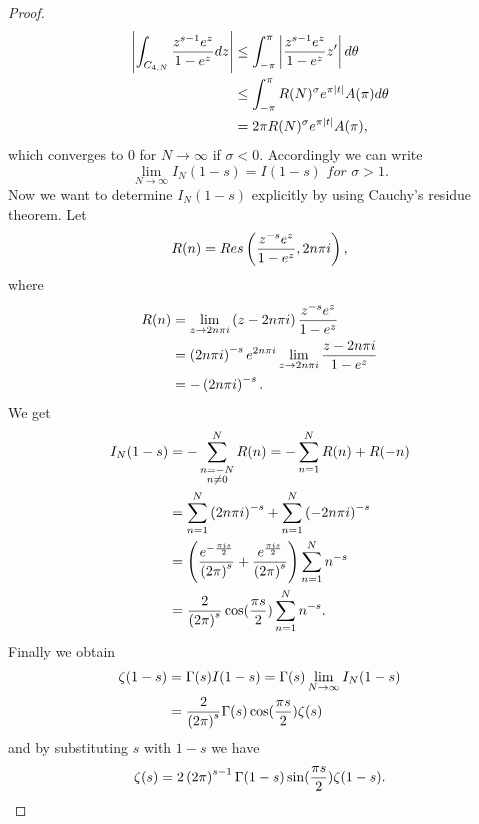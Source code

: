 \begin{proof}
\begin{equation*}
\begin{aligned}
	\left|\int_{C_{4,N}} \frac{z^{s - 1} e^z}{1 - e^z} dz\right|
	&\leq \int_{-\pi}^{\pi} \left|\frac{z^{s - 1} e^z}{1 - e^z} z^\prime\right| d\theta \\
	&\leq \int_{-\pi}^{\pi} R(N)^\sigma e^{\pi \left|t\right|} A(\pi) d\theta \\
	&= 2 \pi R(N)^\sigma e^{\pi \left|t\right|} A(\pi),
\end{aligned}
\end{equation*}
	which converges to $0$ for $N \to \infty$ if $\sigma < 0$. Accordingly we can write
\begin{equation*}
	\lim\limits_{N \to \infty} I_N(1 - s) = I(1 - s) \textit{ for } \sigma > 1.
\end{equation*}
	Now we want to determine $I_N(1 - s)$ explicitly by using Cauchy's residue theorem. Let
\begin{equation*}
	R(n) = Res\left(\frac{z^{-s} e^z}{1 - e^z}, 2 n \pi i\right),
\end{equation*}
	where
\begin{equation*}
\begin{aligned}
	R(n) &= \lim\limits_{z \to 2 n \pi i} \left(z - 2 n \pi i\right) \frac{z^{-s} e^z}{1 - e^z} \\
	&= \left(2 n \pi i\right)^{-s} e^{2 n \pi i} \lim\limits_{z \to 2 n \pi i} \frac{z - 2 n \pi i}{1 - e^z} \\
	&= - \left(2 n \pi i\right)^{-s}.
\end{aligned} 
\end{equation*}
	We get
\begin{equation*}
\begin{aligned}	
	I_N(1 - s)
	&= - \sum _{\substack{n = -N \\ n \neq 0}} ^N R(n) = - \sum _{n = 1} ^N R(n) + R(-n) \\
	&= \sum _{n = 1} ^N \left(2 n \pi i\right)^{-s} + \sum _{n = 1} ^N \left(-2 n \pi i\right)^{-s} \\
	&= \left(\frac{e^{-\frac{\pi i s}{2}}}{\left(2 \pi\right)^s} + \frac{e^{\frac{\pi i s}{2}}}{\left(2 \pi\right)^s}\right) \sum _{n = 1} ^N n^{-s} \\
	&= \frac{2}{\left(2 \pi\right)^s} \cos(\frac{\pi s}{2}) \sum _{n = 1} ^N n^{-s}.
\end{aligned}
\end{equation*}
	Finally we obtain
\begin{equation*}
\begin{aligned}
	\zeta(1 - s) &= \Gamma(s) I(1 - s) = \Gamma(s) \lim\limits_{N \to \infty} I_N(1 - s) \\
	&= \frac{2}{\left(2 \pi\right)^s} \Gamma(s) \cos(\frac{\pi s}{2}) \zeta(s)
\end{aligned}
\end{equation*}
	and by substituting $s$ with $1 - s$ we have
\begin{equation*}
	\zeta(s) = 2\left(2 \pi\right)^{s - 1} \Gamma(1 - s) \sin(\frac{\pi s}{2}) \zeta(1 - s).
\end{equation*}
\end{proof}


